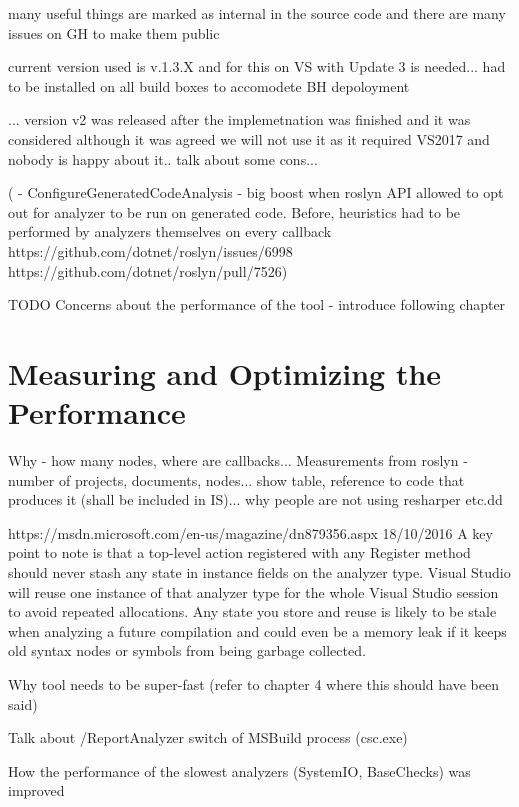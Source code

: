 \documentclass[
  digital, %
  table,   %
  lof,     %
  lot,     %
  oneside,
]{fithesis3}
\begin{document}
many useful things are marked as internal in the source code and there are many issues on GH to make them public

current version used is v.1.3.X and for this on VS with Update 3 is needed... had to be installed on all build boxes to accomodete BH depoloyment

... version v2 was released after the implemetnation was finished and it was considered although it was agreed we will not use it as it required VS2017 and nobody is happy about it.. talk about some cons...

(  - ConfigureGeneratedCodeAnalysis - big boost when roslyn API allowed to opt out for analyzer to be run on generated code. Before, heuristics had to be performed by analyzers themselves on every callback
   https://github.com/dotnet/roslyn/issues/6998
   https://github.com/dotnet/roslyn/pull/7526)


TODO
Concerns about the performance of the tool - introduce following chapter

\chapter{Measuring and Optimizing the Performance}
Why - how many nodes, where are callbacks...
Measurements from roslyn - number of projects, documents, nodes... show table, reference to code that produces it (shall be included in IS)... why people are not using resharper etc.dd

https://msdn.microsoft.com/en-us/magazine/dn879356.aspx 18/10/2016
A key point to note is that a top-level action registered with any Register method should never stash any state in instance fields on the analyzer type. Visual Studio will reuse one instance of that analyzer type for the whole Visual Studio session to avoid repeated allocations. Any state you store and reuse is likely to be stale when analyzing a future compilation and could even be a memory leak if it keeps old syntax nodes or symbols from being garbage collected.

Why tool needs to be super-fast (refer to chapter 4 where this should have been said)

Talk about /ReportAnalyzer switch of MSBuild process (csc.exe)

How the performance of the slowest analyzers (SystemIO, BaseChecks) was improved
\end{document}
